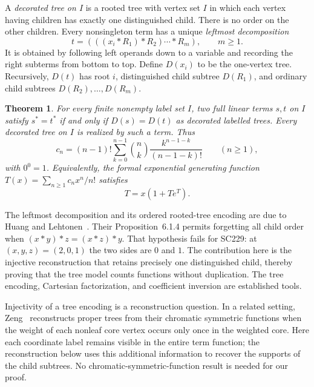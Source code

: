 \documentclass[11pt]{article}
\newtheorem{theorem}{Theorem}
\begin{document}
A \emph{decorated tree on $I$} is a rooted tree with vertex set $I$ in
which each vertex having children has exactly one distinguished child.
There is no order on the other children. Every nonsingleton term has a
unique \emph{leftmost decomposition}
\begin{equation}\label{eq:leftmost}
t=(((x_i\ast R_1)\ast R_2)\cdots\ast R_m),\qquad m\geq1.
\end{equation}
It is obtained by following left operands down to a variable and recording
the right subterms from bottom to top. Define $D(x_i)$ to be the one-vertex
tree. Recursively, $D(t)$ has root $i$, distinguished child subtree $D(R_1)$,
and ordinary child subtrees $D(R_2),\ldots,D(R_m)$.

\begin{theorem}\label{thm:main}
For every finite nonempty label set $I$, two full linear terms $s,t$ on
$I$ satisfy $s^*=t^*$ if and only if $D(s)=D(t)$ as decorated labelled
trees. Every decorated tree on $I$ is realized by such a term. Thus
\begin{equation}\label{eq:sum}
c_n=(n-1)!\sum_{k=0}^{n-1}\binom{n}{k}
                 \frac{k^{n-1-k}}{(n-1-k)!}\qquad(n\geq1),
\end{equation}
with $0^0=1$. Equivalently, the formal exponential generating function
$T(x)=\sum_{n\geq1}c_nx^n/n!$ satisfies
\begin{equation}\label{eq:egf}
T=x(1+Te^T).
\end{equation}
\end{theorem}

The leftmost decomposition and its ordered rooted-tree encoding are due
to Huang and Lehtonen~\cite[Definitions~6.1.2--6.1.3]{HuangLehtonen2023}.
Their Proposition~6.1.4 permits forgetting all child order when
$(x\ast y)\ast z=(x\ast z)\ast y$. That hypothesis fails for SC229:
at $(x,y,z)=(2,0,1)$ the two sides are $0$ and $1$. The contribution here
is the injective reconstruction that retains precisely one distinguished
child, thereby proving that the tree model counts functions without
duplication. The tree encoding, Cartesian factorization, and coefficient
inversion are established tools.

Injectivity of a tree encoding is a reconstruction question. In a related
setting, Zeng~\cite[Theorem~1.1]{Zeng2026Multiplicity} reconstructs proper
trees from their chromatic symmetric functions when the weight of each
nonleaf core vertex occurs only once in the weighted core. Here each
coordinate label remains visible in the entire term function; the
reconstruction below uses this additional information to recover the
supports of the child subtrees. No chromatic-symmetric-function result is
needed for our proof.
\end{document}
